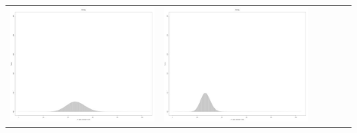 \begin{table}[htbp]
{\begin{tabular}{l | ccccc}
\begin{minipage}{.15\textwidth}
     			 	\includegraphics[width=\linewidth]{images/mema-dens-graph/I9}
    				 \end{minipage}
    			   &	 \begin{minipage}{.15\textwidth}\vspace{2pt}     							
     			 	\includegraphics[width=\linewidth]{images/mema-dens-graph/I12}
    				 \end{minipage}
    			   &	 \begin{minipage}{.15\textwidth}\vspace{2pt}     							

\end{minipage}
\end{tabular}}
\end{table}
